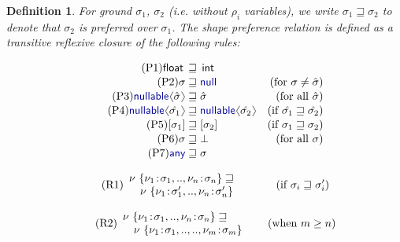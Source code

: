 \documentclass[10pt,preprint,clearpagebib]{sigplanconf}
\newcommand{\langl}{\begin{picture}(4.5,7)
\put(1.1,2.5){\rotatebox{60}{\line(1,0){5.5}}}
\put(1.1,2.5){\rotatebox{300}{\line(1,0){5.5}}}
\end{picture}}
\newcommand{\rangl}{\begin{picture}(4.5,7)
\put(.9,2.5){\rotatebox{120}{\line(1,0){5.5}}}
\put(.9,2.5){\rotatebox{240}{\line(1,0){5.5}}}
\end{picture}}
\newcommand{\kvd}[1]{\textnormal{\textcolor{kvdclr}{\sffamily #1}}}
\newcommand{\ident}[1]{\textnormal{\sffamily #1}}
\newtheorem{definition}{Definition}
\begin{document}
\begin{definition}
For ground $\sigma_1$, $\sigma_2$ (i.e. without $\rho_i$ variables), we write $\sigma_1 \sqsupseteq \sigma_2$ to denote that $\sigma_2$ is preferred over $\sigma_1$. 
The shape preference relation is defined as a transitive reflexive closure of the following rules:

\noindent
\begin{align}
  \label{eq:sub-prim}\tag{P1}
  \ident{float}\,&\sqsupseteq\,\ident{int}&\\[-0.2em]
  \label{eq:sub-null}\tag{P2}
  \sigma &\sqsupseteq \kvd{null}  &(\textnormal{for}~\sigma \neq \hat{\sigma})  \\[-0.2em]
  \label{eq:sub-opt}\tag{P3}
  \kvd{nullable}\langl\hat{\sigma}\rangl &\sqsupseteq \hat{\sigma}  &(\textnormal{for all}~\hat{\sigma})\\[-0.2em]
  \label{eq:sub-opt-cov}\tag{P4}
  \kvd{nullable}\langl\hat{\sigma_1}\rangl &\sqsupseteq 
    \kvd{nullable}\langl\hat{\sigma_2}\rangl  &(\textnormal{if}~\hat{\sigma_1} \sqsupseteq \hat{\sigma_2})\\[-0.2em]
  \label{eq:sub-col}\tag{P5}
  [\sigma_1] &\sqsupseteq [\sigma_2]  &(\textnormal{if}~\sigma_1 \sqsupseteq \sigma_2) \\[-0.2em]
  \label{eq:sub-bot}\tag{P6}
  \sigma &\sqsupseteq \bot  &(\textnormal{for all}~\sigma)\\[-0.2em]
  \label{eq:sub-var-top}\tag{P7}
  \kvd{any} &\sqsupseteq \sigma 
\end{align}
\vspace{-2em}

\noindent
\begin{align}
\label{eq:sub-record1}\tag{R1}
\begin{array}{l}
 \nu~\{ \nu_1\!:\!\sigma_1, .., \nu_n\!:\!\sigma_n \} \sqsupseteq \\
 \quad\nu~\{ \nu_1\!:\!\sigma_1', .., \nu_n\!:\!\sigma_n' \}
\end{array} \qquad ~~~~(\textnormal{if}~\sigma_i \sqsupseteq \sigma_i')
\end{align}

\vspace{-1.5em}

\begin{align}
\label{eq:sub-record2}\tag{R2}
\begin{array}{l}
 \nu~\{ \nu_1\!:\!\sigma_1, .., \nu_n\!:\!\sigma_n \} \sqsupseteq \\
 \quad\nu~\{ \nu_1\!:\!\sigma_1, .., .., \nu_m\!:\!\sigma_m \}
\end{array} \quad~~\, (\textnormal{when}~m \geq n)
\end{align}

\end{definition}
\end{document}
